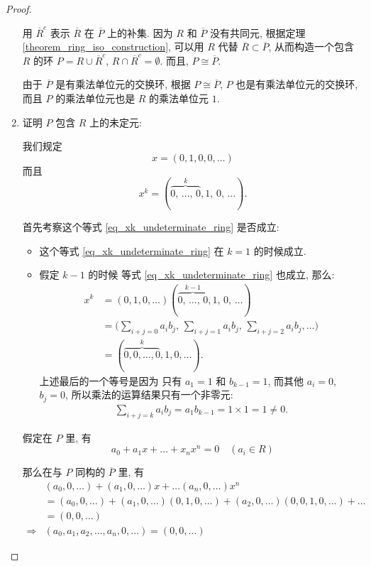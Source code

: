 \documentclass[utf8]{ctexbook}
\theoremstyle{definition}
\begin{document}
\begin{proof}
\begin{enumerate}
{用 $\overline{R}^c$ 表示 $\overline{R}$ 在 $\overline{P}$ 上的补集. 
因为 $R$ 和 $\overline{P}$ 没有共同元, 根据定理 \ref{theorem_ring_iso_construction}, 可以用 $R$ 代替 $\overline{R} \subset \overline{P} $, 从而构造一个包含 $R$ 的环 $P = R \cup \overline{R}^c$, $R \cap \overline{R}^c = \emptyset$. 而且, $P \cong \overline{P}$. 


由于 $\overline{P}$ 是有乘法单位元的交换环, 根据 $P \cong \overline{P}$, $P$ 也是有乘法单位元的交换环, 而且 $P$ 的乘法单位元也是 $R$ 的乘法单位元 $1$.
}
\item{证明 $P$ 包含 $R$ 上的未定元:

我们规定
\begin{equation}
x = (0, 1, 0, 0, \ldots ) \nonumber
\end{equation}
而且
\begin{equation}
x^k = (  \overbrace{0, \, \ldots, \, 0}^{k}, 1, \, 0, \, \ldots ) . \label{eq_xk_undeterminate_ring}
\end{equation}

首先考察这个等式 \ref{eq_xk_undeterminate_ring} 是否成立:
\begin{itemize}
\item{这个等式 \ref{eq_xk_undeterminate_ring} 在 $k=1$ 的时候成立.}
\item{假定 $k-1$ 的时候 等式 \ref{eq_xk_undeterminate_ring} 也成立, 那么:
\begin{align*}
x^k & = (0, 1, 0, \ldots) (  \overbrace{0, \, \ldots, \, 0}^{k-1},  1, \, 0, \, \ldots )  \\
 & = \Big( \sum_{i+j = 0} a_i b_j, \, \sum_{i+j=1} a_i b_j ,\, \sum_{i+j=2} a_i b_j ,\ldots \Big) \\
 & = (\overbrace{0, 0, \ldots, 0}^{k} , 1, 0, \ldots ) .
\end{align*}
上述最后的一个等号是因为 只有 $a_1 =1 $ 和  $b_{k-1} =1 $, 而其他 $a_i =0$, $b_j = 0$, 所以乘法的运算结果只有一个非零元:
\begin{align*}
\sum_{i+j = k} a_i b_j = a_1 b_{k-1} = 1 \times 1 = 1 \neq 0 .
\end{align*}
}
\end{itemize}

假定在 $P$ 里, 有
\begin{equation}
a_0 + a_1 x + \ldots + x_n x^n = 0 \quad (a_i \in R) \nonumber
\end{equation}

那么在与 $P$ 同构的 $\overline{P}$ 里, 有
\begin{align*}
& (a_0, 0, \ldots ) + (a_1, 0, \ldots ) x + \ldots (a_n, 0, \ldots ) x^n \\
& = (a_0, 0, \ldots ) + (a_1, 0, \ldots ) (0, 1, 0 ,\ldots) + (a_2, 0, \ldots ) (0, 0, 1, 0, \ldots) + \ldots  
\\
& = (0, 0, \ldots) \\
\Longrightarrow & (a_0, a_1, a_2, \ldots , a_n, 0, \ldots) = (0,0, \ldots )
\end{align*}

}
\end{enumerate}
\end{proof}
\end{document}
